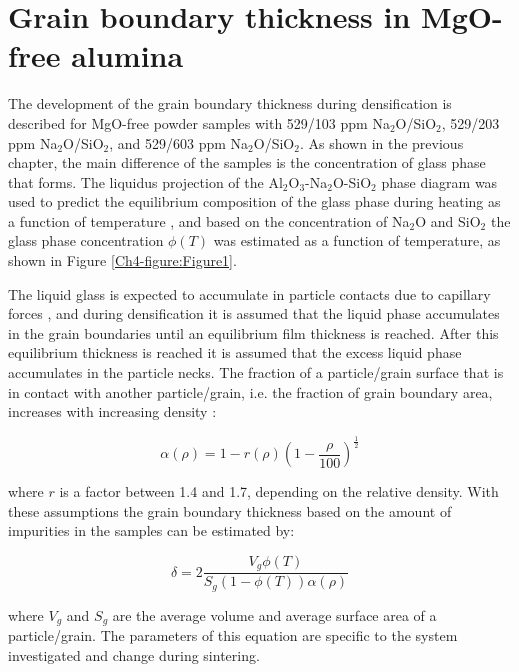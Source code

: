 \section{Grain boundary thickness in MgO-free alumina}
The development of the grain boundary thickness during densification is described for MgO-free powder samples with 529/103 ppm Na$_{2}$O/SiO$_{2}$, 529/203 ppm Na$_{2}$O/SiO$_{2}$, and 529/603 ppm Na$_{2}$O/SiO$_{2}$. As shown in the previous chapter, the main difference of the samples is the concentration of glass phase that forms. The liquidus projection of the Al$_{2}$O$_{3}$-Na$_{2}$O-SiO$_{2}$ phase diagram \cite{Svoboda1996} was used to predict the equilibrium composition of the glass phase during heating as a function of temperature \cite{Frueh2016}, and based on the concentration of Na$_{2}$O and SiO$_{2}$ the glass phase concentration $\phi(T)$ was estimated as a function of temperature, as shown in Figure \ref{Ch4-figure:Figure1}. 

The liquid glass is expected to accumulate in particle contacts due to capillary forces \cite{Shaw1986}, and during densification it is assumed that the liquid phase accumulates in the grain boundaries until an equilibrium film thickness \cite{Subramaniam2006} is reached. After this equilibrium thickness is reached it is assumed that the excess liquid phase accumulates in the particle necks. The fraction of a particle/grain surface that is in contact with another particle/grain, i.e. the fraction of grain boundary area, increases with increasing density \cite{German2016}:

\begin{equation}
\label{Ch4-eq: eq1}
\alpha(\rho) = 1 - r(\rho) \left(1-\frac{\rho}{100} \right)^{\frac{1}{2}}
\end{equation}

\noindent where $r$ is a factor between 1.4 and 1.7, depending on the relative density. With these assumptions the grain boundary thickness based on the amount of impurities in the samples can be estimated by:

\begin{equation}
\label{Ch4-eq: eq2}
\delta = 2 \frac{V_{g}\phi (T)}{S_{g}\left(1-\phi(T)\right)\alpha(\rho)}
\end{equation}

\noindent where $V_{g}$ and $S_{g}$ are the average volume and average surface area of a particle/grain. The parameters of this equation are specific to the system investigated and change during sintering.

